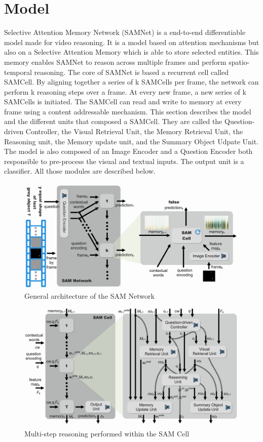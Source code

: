 \section{Model}

Selective Attention Memory Network (SAMNet) is a end-to-end differentiable model made for video reasoning. It is a model based on attention mechanisms but also on a Selective Attention Memory which is able to store selected entities. This memory enables SAMNet to reason across multiple frames and perform spatio-temporal reasoning. 
The core of SAMNet is based a recurrent cell called SAMCell. By aligning together a series of k SAMCells per frame, the network can perform k reasoning steps over a frame. At every new frame, a new series of k SAMCells is initiated. The SAMCell can read and write to memory at every frame using a content addressable mechanism. This section describes the model and the different units that composed a SAMCell. They are called the Question-driven Controller, the Visual Retrieval Unit, the Memory Retrieval Unit, the Reasoning unit, the Memory update unit, and the Summary Object Udpate Unit. 
The model is also composed of an Image Encoder and a Question Encoder both responsible to pre-process the visual and textual inputs. The output unit is a classifier.
All those modules are described below.


\begin{figure}
	\centering
	\includegraphics[width=1\linewidth]{../img/architecture/samnet_architecture3}
	\caption{General architecture of the SAM Network}
	\label{fig:samnetarchitecture}
\end{figure}
	
\begin{figure}
	\centering
	\includegraphics[width=1\linewidth]{../img/architecture/samcell_reasoning}
	\caption{Multi-step reasoning performed within the SAM Cell}
	\label{fig:samnetarchitecture}
\end{figure}
	
